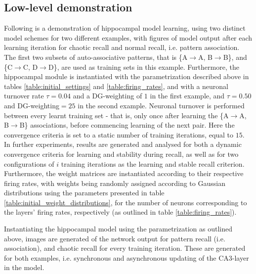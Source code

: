 \subsection{Low-level demonstration}
Following is a demonstration of hippocampal model learning, using two distinct model schemes for two different examples, with figures of model output after each learning iteration for chaotic recall and normal recall, i.e. pattern association. The first two subsets of auto-associative patterns, that is \{A$\rightarrow$A, B$\rightarrow$B\}, and \{C$\rightarrow$C, D$\rightarrow$D\}, are used as training sets in this example.
Furthermore, the hippocampal module is instantiated with the parametrization described above in tables \ref{table:initial_settings} and \ref{table:firing_rates}, and with a neuronal turnover rate $\tau = 0.04$ and a DG-weighting of $1$ in the first example, and $\tau=0.50$ and DG-weighting$=25$ in the second example. Neuronal turnover is performed between every learnt training set - that is, only once after learning the \{A$\rightarrow$A, B$\rightarrow$B\} associations, before commencing learning of the next pair. Here the convergence criteria is set to a static number of training iterations, equal to $15$.
In further experiments, results are generated and analysed for both a dynamic convergence criteria for learning and stability during recall, as well as for two configurations of $i$ training iterations as the learning and stable recall criterion. Furthermore, the weight matrices are instantiated according to their respective firing rates, with weights being randomly assigned according to Gaussian distributions using the parameters presented in table \ref{table:initial_weight_distributions}, for the number of neurons corresponding to the layers' firing rates, respectively (as outlined in table \ref{table:firing_rates}).

Instantiating the hippocampal model using the parametrization as outlined above, images are generated of the network output for pattern recall (i.e. association), and chaotic recall for every training iteration. These are generated for both examples, i.e. synchronous and asynchronous updating of the CA3-layer in the model.

